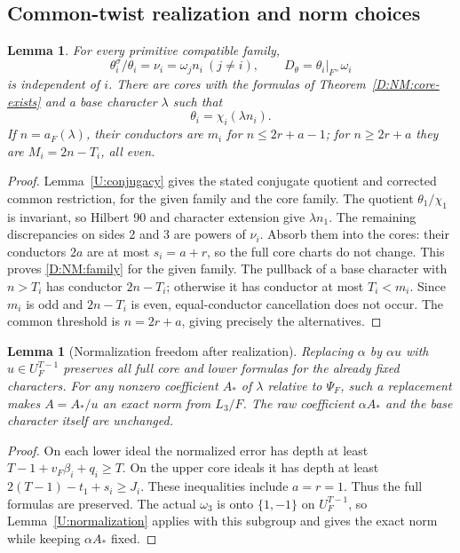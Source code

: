 \documentclass[11pt]{amsart}
\newtheorem{lemma}[theorem]{Lemma}
\theoremstyle{definition}
\theoremstyle{remark}
\begin{document}
\subsection{Common-twist realization and norm choices}
\begin{lemma}\label{D:NM:realize}
For every primitive compatible family,
\[
 \theta_i^\sigma/\theta_i=\nu_i=\omega_jn_i\ (j\ne i),\qquad
 D_\theta=\theta_i|_{F^\times}\omega_i
\]
is independent of $i$. There are cores with the formulas of
Theorem~\ref{D:NM:core-exists} and a base character $\lambda$ such that
\begin{equation}\label{D:NM:family}
 \theta_i=\chi_i(\lambda n_i).
\end{equation}
If $n=a_F(\lambda)$, their conductors are $m_i$ for $n\le2r+a-1$;
for $n\ge2r+a$ they are $M_i=2n-T_i$, all even.
\end{lemma}
\begin{proof}
Lemma~\ref{U:conjugacy} gives the stated conjugate quotient and
corrected common restriction, for the given family and the core family.
The quotient $\theta_1/\chi_1$ is invariant, so Hilbert 90 and character
extension give $\lambda n_1$. The remaining discrepancies on sides
2 and 3 are powers of $\nu_i$. Absorb them into the cores: their
conductors $2a$ are at most $s_i=a+r$, so the full core charts do not
change. This proves \eqref{D:NM:family} for the given family.
The pullback of a base character with $n>T_i$ has conductor $2n-T_i$;
otherwise it has conductor at most $T_i<m_i$. Since $m_i$ is odd and
$2n-T_i$ is even, equal-conductor cancellation does not occur.
The common threshold is $n=2r+a$, giving precisely the alternatives.
\end{proof}

\begin{lemma}[Normalization freedom after realization]\label{D:NM:freedom}
Replacing $\alpha$ by $\alpha u$ with $u\in U_F^{T-1}$ preserves all
full core and lower formulas for the already fixed characters.
For any nonzero coefficient $A_*$ of $\lambda$ relative to $\Psi_F$,
such a replacement makes $A=A_*/u$ an exact norm from $L_3/F$.
The raw coefficient $\alpha A_*$ and the base character itself are
unchanged.
\end{lemma}
\begin{proof}
On each lower ideal the normalized error has depth at least
$T-1+v_F\beta_i+q_i\ge T$. On the upper core ideals it has depth
at least $2(T-1)-t_1+s_i\ge J_i$. These inequalities include $a=r=1$.
Thus the full formulas are preserved. The actual $\omega_3$ is
onto $\{1,-1\}$ on $U_F^{T-1}$, so Lemma~\ref{U:normalization}
applies with this subgroup and gives the exact norm while keeping
$\alpha A_*$ fixed.
\end{proof}
\end{document}

